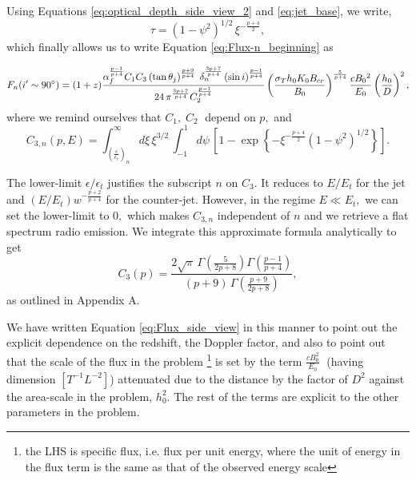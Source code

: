 Using Equations \ref{eq:optical_depth_side_view_2} and \ref{eq:jet_base}, we write,
\begin{equation}
\tau = (1-\psi^{2})^{1/2}\,\xi^{-\frac{p+4}{2}}, \label{eq:tau_to_integrate}
\end{equation} which finally allows us to write Equation \ref{eq:Flux-n_beginning} as

\begin{equation}
F_n (i' \sim 90^{\circ}) = (1+z) \dfrac{\alpha_f^{\frac{p-1}{p+4}} C_{1} C_{3} \left( \tan \theta_{j} \right)^{\frac{p+9}{p+4}} \; \delta_n^{\frac{3p+7}{p+4}} \left( \sin i \right) ^{\frac{p-1}{p+4}}}{24 \, \pi^{\frac{3p+7}{p+4}} C_{2} ^{\frac{p-1}{p+4}}} \left(\dfrac{\sigma_T h_0 K_0 B_{cr}}{B_0}\right)^{\frac{5}{p+4}} \frac{ c B_0{^2} }{E_0} \left(\frac{h_0}{D}\right)^2, \label{eq:Flux_side_view}
\end{equation} where we remind ourselves that $ C_1, \; C_2 \; $ depend on $ p, $ and
\begin{equation}
C_{3,n}(p, E) = \int_{\left(\frac{\epsilon}{\epsilon_{t}}\right)_{n}}^{\infty}d\xi\,\xi^{3/2}\,\int_{-1}^{1}d\psi\, \left[ 1 - \exp \left\{ -\xi^{-\frac{p+4}{2}}\left(1-\psi^{2}\right)^{1/2} \right\} \right]. \label{eq:C_3_double_integral}
\end{equation}

The lower-limit $ \epsilon / \epsilon_{t} $ justifies the subscript $ n $ on $ C_{3} . $ It reduces to $ E / E_{t} $ for the jet and $ \left(E/E_{t}\right) w^{ -\frac{p+2}{p+4} } $ for the counter-jet. However, in the regime $E\ll E_{t},$ we can set the lower-limit to $ 0, $ which makes $C_{3,n}$ independent of $ n $ and we retrieve a flat spectrum radio emission. We integrate this approximate formula analytically to get
\begin{equation}
C_3(p) = \dfrac{2 \sqrt{\pi} \, \Gamma(\frac{5}{2p+8}) \Gamma(\frac{p-1}{p+4})}{ (p+9) \, \Gamma(\frac{p+9}{2p+8}) }, \label{eq:C_3}
\end{equation} as outlined in Appendix A.

We have written Equation \ref{eq:Flux_side_view} in this manner to point out the explicit dependence on the redshift, the Doppler factor, and also to point out that the scale of the flux in the problem \footnote{the LHS is specific flux, i.e. flux per unit energy, where the unit of energy in the flux term is the same as that of the observed energy scale} is set by the term $ \frac{c B_0^2}{E_0} \; $ (having dimension $ [T^{-1}L^{-2}] $) attenuated due to the distance by the factor of $ D^2 $ against the area-scale in the problem, $ h_0^2 . $ The rest of the terms are explicit to the other parameters in the problem.

